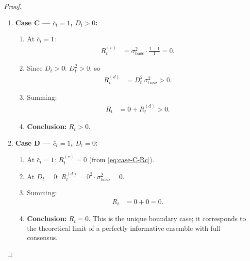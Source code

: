 \documentclass[12pt,openany]{book}
\numberwithin{equation}{chapter}
\theoremstyle{plain}
\theoremstyle{definition}
\theoremstyle{remark}
\begin{document}
\begin{proof}
\begin{enumerate}
  \item \textbf{Case C --- $\bar{c}_t = 1$, $D_t > 0$:}
        \begin{enumerate}
          \item At $\bar{c}_t = 1$:
                \begin{align}
                  R_t^{(c)}
                  &= \sigma_{\mathrm{base}}^2
                     \cdot
                     \frac{1-1}{1}
                   = 0.
                  \label{eq:case-C-Rc}
                \end{align}
          \item Since $D_t > 0$: $D_t^2 > 0$, so
                \begin{align}
                  R_t^{(d)}
                  &= D_t^2\,\sigma_{\mathrm{base}}^2
                   > 0.
                  \label{eq:case-C-Rd}
                \end{align}
          \item Summing:
                \begin{align}
                  R_t
                  &= 0 + R_t^{(d)}
                   > 0.
                  \label{eq:case-C-Rt}
                \end{align}
          \item \textbf{Conclusion:} $R_t > 0$. \checkmark
        \end{enumerate}

  \item \textbf{Case D --- $\bar{c}_t = 1$, $D_t = 0$:}
        \begin{enumerate}
          \item At $\bar{c}_t = 1$:
                $R_t^{(c)} = 0$
                (from \eqref{eq:case-C-Rc}).
          \item At $D_t = 0$:
                $R_t^{(d)} = 0^2 \cdot
                 \sigma_{\mathrm{base}}^2 = 0$.
          \item Summing:
                \begin{align}
                  R_t
                  &= 0 + 0 = 0.
                  \label{eq:case-D-Rt}
                \end{align}
          \item \textbf{Conclusion:} $R_t = 0$.
                This is the unique boundary case;
                it corresponds to the theoretical limit of
                a perfectly informative ensemble with full
                consensus.
        \end{enumerate}
\end{enumerate}


\end{proof}
\end{document}
